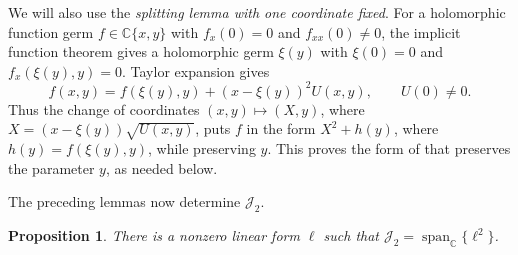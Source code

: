 \documentclass[11pt,letterpaper]{article}
\numberwithin{equation}{section}
\newtheorem{proposition}[proposition]{Proposition}
\theoremstyle{remark}
\theoremstyle{plain}
\newcommand{\C}{\mathbb{C}}
\begin{document}
We will also use the \emph{splitting lemma with one coordinate fixed}.
For a holomorphic function germ $f\in\C\{x,y\}$ with
$f_x(0)=0$ and $f_{xx}(0)\neq0$, the implicit function theorem gives
a holomorphic germ $\xi(y)$ with $\xi(0)=0$ and $f_x(\xi(y),y)=0$.
Taylor expansion gives
\[
 f(x,y)=f(\xi(y),y)+(x-\xi(y))^2U(x,y),\qquad U(0)\neq0.
\]
Thus the change of coordinates $(x,y)\mapsto(X,y)$, where
$X=(x-\xi(y))\sqrt{U(x,y)}$, puts $f$ in the form $X^2+h(y)$,
where $h(y)=f(\xi(y),y)$, while preserving $y$.  This proves the form
of \cite[Theorem~I.2.47]{GreuelLossenShustin} that preserves the parameter $y$, as needed below.

The preceding lemmas now determine $\mathcal J_2$.

\begin{proposition}
\label{prop:d2-quadratic-jet}
There is a nonzero linear form $\ell$ such that
$\mathcal J_2=\operatorname{span}_{\C}\{\ell^2\}$.
\end{proposition}
\end{document}
